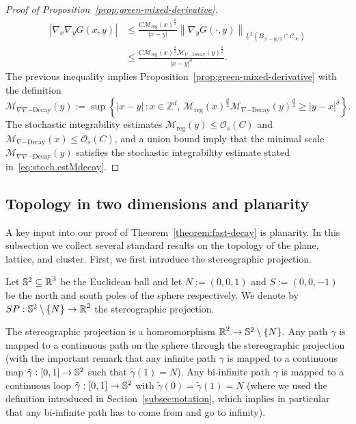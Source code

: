 \documentclass[12pt]{amsart}
\numberwithin{equation}{section}
\begin{document}
\begin{proof}[Proof of Proposition~\ref{prop:green-mixed-derivative}]
\begin{align*}
			\left| \nabla_x \nabla_y G(x , y) \right| & \leq \frac{C \mathcal{M}_{\mathrm{reg}}(x)^{\frac{d}{2}} 
			}{|x-y|} \left\| \nabla_y G(\cdot , y) \right\|_{\underline{L}^2 \left(B_{|x - y|/2} \cap \mathscr{C}_{\infty} \right)} \\
			& \leq \frac{C \mathcal{M}_{\mathrm{reg}}(x)^{\frac{d}{2}} \mathcal{M}_{\nabla\mathrm{-Decay}}(y)^{\frac{d}{2}}}{|x-y|^d}.
		\end{align*}
		The previous inequality implies Proposition~\ref{prop:green-mixed-derivative} with the definition
		\begin{equation*}
			\mathcal{M}_{\nabla\nabla\mathrm{-Decay}}(y) := \sup \left\{ |x - y| \, : x \in \mathbb{Z}^d, \, \mathcal{M}_{\mathrm{reg}}(x)^{\frac{d}{2}} \mathcal{M}_{\nabla\mathrm{-Decay}}(y)^{\frac{d}{2}} \geq |y - x|^\delta \right\}.
		\end{equation*}
		The stochastic integrability estimates $\mathcal{M}_{\mathrm{reg}}(y) \leq \mathcal{O}_s(C)$ and $\mathcal{M}_{\nabla\mathrm{-Decay}}(x)\leq \mathcal{O}_s(C)$, and a union bound imply that the minimal scale $\mathcal{M}_{\nabla\nabla\mathrm{-Decay}}(y) $ satisfies the stochastic integrability estimate stated in~\eqref{eq:stoch.estMdecay}.
	\end{proof}
	
	\subsection{Topology in two dimensions and planarity}
	A key input into our proof of Theorem~\ref{theorem:fast-decay} is planarity.  In this subsection we collect several standard results on the topology of the plane, lattice, and cluster. First, we first introduce the stereographic projection.
	
	\begin{definition}
		Let $\S^2 \subseteq \R^3$ be the Euclidean ball and let $N := (0,0,1)$ and $S := (0,0,-1)$ be the north and south poles of the sphere respectively.
		We denote by $SP : \S^2 \setminus \left\{ N \right\}  \to \R^2$ the stereographic projection. 
	\end{definition}
	
	The stereographic projection is a homeomorphism $\R^2 \to \S^2 \setminus \left\{ N \right\}$. Any path $\gamma$ is mapped to a continuous path on the sphere through the stereographic projection (with the important remark that any infinite path $\gamma$ is mapped to a continuous map $\tilde \gamma :[0 , 1] \to \S^2$ such that $\tilde \gamma(1) = N$). Any bi-infinite path $\gamma$ is mapped to a continuous loop $\tilde \gamma :[0 , 1] \to \S^2$ with $\tilde \gamma(0) = \tilde \gamma(1) = N$ (where we used the definition introduced in Section~\ref{subsec:notation}, which implies in particular that any bi-infinite path has to come from and go to infinity).
	
\end{document}
